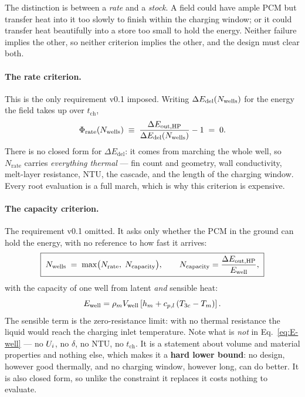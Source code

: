 \noindent
The distinction is between a \emph{rate} and a \emph{stock}. A field could have
ample PCM but transfer heat into it too slowly to finish within the charging
window; or it could transfer heat beautifully into a store too small to hold the
energy. Neither failure implies the other, so neither criterion implies the
other, and the design must clear both.

\paragraph{The rate criterion.}
This is the only requirement v0.1 imposed. Writing
$\Delta E_{\mathrm{del}}(N_{\mathrm{wells}})$ for the energy the field takes up over
$t_{\mathrm{ch}}$,
\begin{equation}
  \Phi_{\mathrm{rate}}(N_{\mathrm{wells}})
  \;\equiv\;
  \frac{\Delta E_{\mathrm{out,HP}}}{\Delta E_{\mathrm{del}}(N_{\mathrm{wells}})} - 1
  \;=\; 0 .
  \label{eq:N-rate}
\end{equation}
There is no closed form for $\Delta E_{\mathrm{del}}$: it comes from marching
the whole well, so $N_{\mathrm{rate}}$ carries \emph{everything thermal} ---
fin count and geometry, wall conductivity, melt-layer resistance, NTU, the
cascade, and the length of the charging window. Every root evaluation is a full
march, which is why this criterion is expensive.

\paragraph{The capacity criterion.}
The requirement v0.1 omitted. It asks only whether the PCM in the ground can
hold the energy, with no reference to how fast it arrives:
\begin{equation}
  \boxed{\;
  N_{\mathrm{wells}} \;=\; \max\bigl(N_{\mathrm{rate}},\; N_{\mathrm{capacity}}\bigr),
  \qquad
  N_{\mathrm{capacity}}
  = \frac{\Delta E_{\mathrm{out,HP}}}{E_{\mathrm{well}}},
  \;}
  \label{eq:sizing}
\end{equation}
with the capacity of one well from latent \emph{and} sensible heat:
\begin{equation}
  E_{\mathrm{well}}
  = \rho_{m} V_{\mathrm{well}}
    \left[h_{m} + c_{p,l}\left(T_{3c}-T_{m}\right)\right].
  \label{eq:E-well}
\end{equation}
The sensible term is the zero-resistance limit: with no thermal resistance the
liquid would reach the charging inlet temperature. Note what is \emph{not} in
Eq.~\eqref{eq:E-well} --- no $U_{i}$, no $\delta$, no NTU, no $t_{\mathrm{ch}}$.
It is a statement about volume and material properties and nothing else, which
makes it a \textbf{hard lower bound}: no design, however good thermally, and no
charging window, however long, can do better. It is also closed form, so unlike
the constraint it replaces it costs nothing to evaluate.


